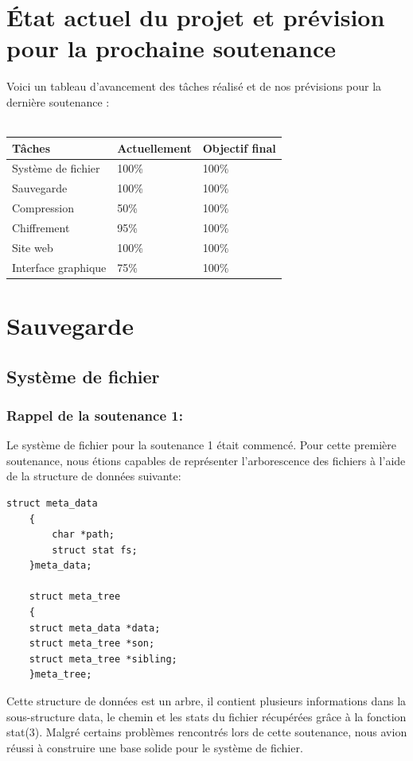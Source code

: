 \section{État actuel du projet et prévision pour la prochaine soutenance}
        
        Voici un tableau d'avancement des tâches réalisé et de nos prévisions pour la dernière soutenance : \\ \\
    
        {\normalsize
    	\begin{tabular}{|p{7cm}|p{2.4cm}|p{2.4cm}|}
    		\hline
    		Tâches & Actuellement & Objectif final \\
    		\hline
    		Système de fichier & 100\% & 100\% \\
    		\hline
    		Sauvegarde & 100\% & 100\% \\
    		\hline
    		Compression & 50\% & 100\% \\
    		\hline
    		Chiffrement & 95\% & 100\% \\
    		\hline
    		Site web & 100\% & 100\% \\
    		\hline
    		Interface graphique & 75\% & 100\% \\
    		\hline
    	\end{tabular}
    	\label{répartition}}

\newpage

\section{Sauvegarde}
    
    \subsection{Système de fichier}
        \subsubsection{Rappel de la soutenance 1:}
        Le système de fichier pour la soutenance 1 était commencé. Pour cette première soutenance, nous étions capables de représenter l'arborescence des fichiers à l'aide de la structure de données suivante:
        \begin{lstlisting}[style=CStyle]
    struct meta_data
    {
        char *path;
        struct stat fs;
    }meta_data;
    
    struct meta_tree
    {
    struct meta_data *data;
    struct meta_tree *son;
    struct meta_tree *sibling;
    }meta_tree;
		\end{lstlisting}
		Cette structure de données est un arbre, il contient plusieurs informations dans la sous-structure data, le chemin et les stats du fichier récupérées grâce à la fonction stat(3).
		Malgré certains problèmes rencontrés lors de cette soutenance, nous avion réussi à construire une base solide pour le système de fichier.
